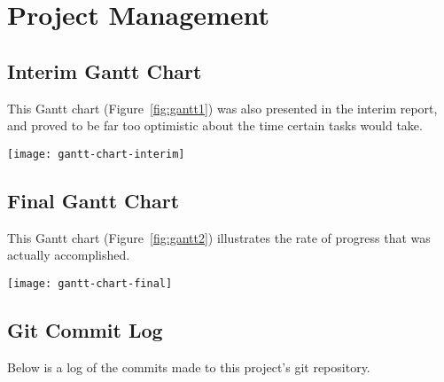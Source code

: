 \chapter{Project Management} %
\label{apdx:project_mang}

\section{Interim Gantt Chart} %
\label{apdx:gantt_chart1}
	This Gantt chart (Figure~\ref{fig:gantt1}) was also presented in the interim report, and proved to be far too optimistic about the time certain tasks would take.
	\begin{sidewaysfigure}[tb]
		\begin{center}
			\texttt{[image: gantt-chart-interim]}
		\end{center}
		\caption{Interim Gantt chart}
		\label{fig:gantt1}
	\end{sidewaysfigure}

	\clearpage

\section{Final Gantt Chart} %
\label{apdx:gantt_chart2}
	This Gantt chart (Figure~\ref{fig:gantt2}) illustrates the rate of progress that was actually accomplished.
	\begin{sidewaysfigure}[tb]
		\begin{center}
			\texttt{[image: gantt-chart-final]}
		\end{center}
		\caption{Final Gantt chart}
		\label{fig:gantt2}
	\end{sidewaysfigure}

	\clearpage


\section{Git Commit Log} %
\label{apdx:git_commit_log}
Below is a log of the commits made to this project's git repository.

